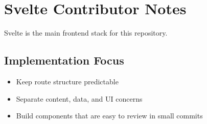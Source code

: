 \section{Svelte Contributor Notes}

Svelte is the main frontend stack for this repository.

\subsection{Implementation Focus}
\begin{itemize}
  \item Keep route structure predictable
  \item Separate content, data, and UI concerns
  \item Build components that are easy to review in small commits
\end{itemize}
